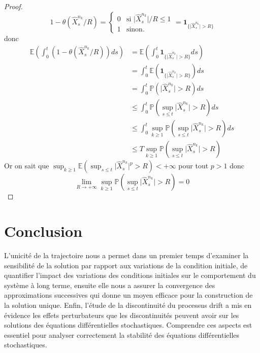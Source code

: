 \documentclass[A4paper,12pt]{report}
\newcommand{\E}{{\mathbb{E}}}
\newcommand{\pr}{{\mathbb{P}}}
\begin{document}
\begin{proof}
$$
1- \theta(\widehat{X}_{s}^{n_{k}}/R) = \left\{
    \begin{array}{ll}
        0 & \mbox{si } \lvert \widehat{X}_{s}^{n_{k}} \rvert/R \leq 1 \\
        1 & \mbox{sinon.}
    \end{array}
    = \mathbf{1}_{\{\lvert \widehat{X}_{s}^{n_{k}} \rvert > R\} }
\right.
$$
donc 
\begin{align*}
\E \left( \int_0 ^t (1-\theta(\widehat{X}_{s}^{n_{k}}/R))ds \right) &= \E \left( \int_0^t \mathbf{1}_{\{\lvert \widehat{X}_{s}^{n_{k}}\rvert  > R\} } ds \right)\\
& = \int_0^t \E \left(  \mathbf{1}_{\{\lvert \widehat{X}_{s}^{n_{k}}\rvert  > R\} } \right) ds \\
& = \int_0^t \pr(\lvert \widehat{X}_{s}^{n_{k}}\rvert > R)ds\\
&\leq \int_0^t \pr (\sup_{s\leq t}\lvert \widehat{X}_{s}^{n_{k}}\rvert > R)ds \\
&\leq \int_0^t \sup_{k \geq 1} \pr(\sup_{s\leq t}\lvert \widehat{X}_{s}^{n_{k}}\rvert > R)ds\\ 
&\leq T \sup_{k \geq 1} \pr(\sup_{s\leq t}\lvert \widehat{X}_{s}^{n_{k}}\rvert > R) 
\end{align*}
Or on sait que $\sup_{k\geq 1} \E(\sup_{s\leq t}\lvert \widehat{X}_{s}^{n_{k}}\rvert^p > R) < +\infty $ pour tout $p>1$ donc $$\lim_{R\rightarrow +\infty} \sup_{k \geq 1} \pr(\sup_{s\leq t}\lvert \widehat{X}_{s}^{n_{k}}\rvert > R)=0 $$
\end{proof}
\chapter*{Conclusion}
L'unicité de la trajectoire nous a permet dans un premier temps d'examiner la sensibilité de la solution par rapport aux variations de la  condition initiale, de quantifier l'impact des variations des conditions initiales sur le comportement du système à long terme, ensuite elle nous a assurer la convergence des approximations successives qui donne un moyen efficace pour la construction de la solution unique. Enfin, l'étude de la discontinuité du processus drift a mis en évidence les effets perturbateurs que les discontinuités peuvent avoir sur les solutions des équations différentielles stochastiques. Comprendre ces aspects est essentiel pour analyser correctement la stabilité des équations différentielles stochastiques.
\end{document}
